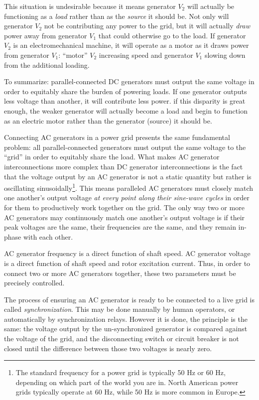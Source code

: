 This situation is undesirable because it means generator $V_2$ will actually be functioning as a \textit{load} rather than as the \textit{source} it should be.  Not only will generator $V_2$ not be contributing any power to the grid, but it will actually \textit{draw} power away from generator $V_1$ that could otherwise go to the load.  If generator $V_2$ is an electromechanical machine, it will operate as a motor as it draws power from generator $V_1$: ``motor'' $V_2$ increasing speed and generator $V_1$ slowing down from the additional loading.

To summarize: parallel-connected DC generators must output the same voltage in order to equitably share the burden of powering loads.  If one generator outputs less voltage than another, it will contribute less power.  if this disparity is great enough, the weaker generator will actually become a load and begin to function as an electric motor rather than the generator (source) it should be.

\vskip 10pt

\filbreak

Connecting AC generators in a power grid presents the same fundamental problem: all parallel-connected generators must output the same voltage to the ``grid'' in order to equitably share the load.  What makes AC generator interconnections more complex than DC generator interconnections is the fact that the voltage output by an AC generator is not a static quantity but rather is oscillating sinusoidally\footnote{The standard frequency for a power grid is typically 50 Hz or 60 Hz, depending on which part of the world you are in.  North American power grids typically operate at 60 Hz, while 50 Hz is more common in Europe.}.  This means paralleled AC generators must closely match one another's output voltage \textit{at every point along their sine-wave cycles} in order for them to productively work together on the grid.  The only way two or more AC generators may continuously match one another's output voltage is if their peak voltages are the same, their frequencies are the same, and they remain in-phase with each other.  

AC generator frequency is a direct function of shaft speed.  AC generator voltage is a direct function of shaft speed and rotor excitation current.  Thus, in order to connect two or more AC generators together, these two parameters must be precisely controlled.

The process of ensuring an AC generator is ready to be connected to a live grid is called \textit{synchronization}.  This may be done manually by human operators, or automatically by synchronization relays.  However it is done, the principle is the same: the voltage output by the un-synchronized generator is compared against the voltage of the grid, and the disconnecting switch or circuit breaker is not closed until the difference between those two voltages is nearly zero.      

